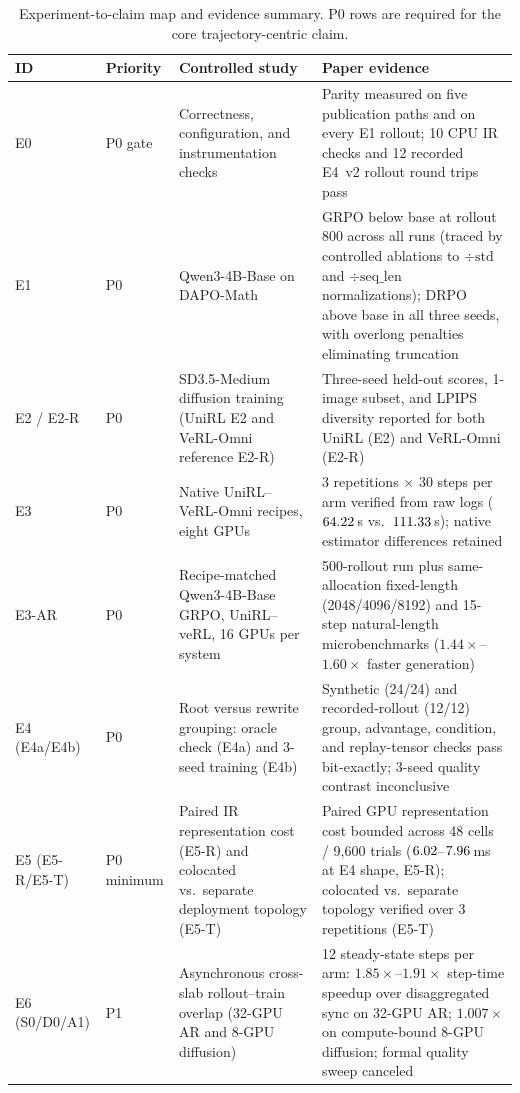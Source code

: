 \documentclass[10pt]{article}
\begin{document}
\begin{table}[H]
\caption{Experiment-to-claim map and evidence summary. P0 rows are required for the core trajectory-centric claim.}
\label{tab:experiment-map}
\centering
\scriptsize
\begin{tabularx}{\textwidth}{@{}llL{0.31\textwidth}Y@{}}
\toprule
ID & Priority & Controlled study & Paper evidence \\
\midrule
E0 & P0 gate & Correctness, configuration, and instrumentation checks & Parity measured on five publication paths and on every E1 rollout; 10 CPU IR checks and 12 recorded E4~v2 rollout round trips pass \\
E1 & P0 & Qwen3-4B-Base on DAPO-Math & GRPO below base at rollout 800 across all runs (traced by controlled ablations to $\div\text{std}$ and $\div\text{seq\_len}$ normalizations); DRPO above base in all three seeds, with overlong penalties eliminating truncation \\
E2 / E2-R & P0 & SD3.5-Medium diffusion training (UniRL E2 and VeRL-Omni reference E2-R) & Three-seed held-out scores, 1-image subset, and LPIPS diversity reported for both UniRL (E2) and VeRL-Omni (E2-R) \\
E3 & P0 & Native UniRL--VeRL-Omni recipes, eight GPUs & 3 repetitions $\times$ 30 steps per arm verified from raw logs ($64.22$\,s vs.\ $111.33$\,s); native estimator differences retained \\
E3-AR & P0 & Recipe-matched Qwen3-4B-Base GRPO, UniRL--veRL, 16 GPUs per system & 500-rollout run plus same-allocation fixed-length (2048/4096/8192) and 15-step natural-length microbenchmarks ($1.44\times$--$1.60\times$ faster generation) \\
E4 (E4a/E4b) & P0 & Root versus rewrite grouping: oracle check (E4a) and 3-seed training (E4b) & Synthetic (24/24) and recorded-rollout (12/12) group, advantage, condition, and replay-tensor checks pass bit-exactly; 3-seed quality contrast inconclusive \\
E5 (E5-R/E5-T) & P0 minimum & Paired IR representation cost (E5-R) and colocated vs.\ separate deployment topology (E5-T) & Paired GPU representation cost bounded across 48 cells / 9,600 trials ($6.02$--$7.96$\,ms at E4 shape, E5-R); colocated vs.\ separate topology verified over 3 repetitions (E5-T) \\
E6 (S0/D0/A1) & P1 & Asynchronous cross-slab rollout--train overlap (32-GPU AR and 8-GPU diffusion) & 12 steady-state steps per arm: $1.85\times$--$1.91\times$ step-time speedup over disaggregated sync on 32-GPU AR; $1.007\times$ on compute-bound 8-GPU diffusion; formal quality sweep canceled \\
\bottomrule
\end{tabularx}
\end{table}
\end{document}
